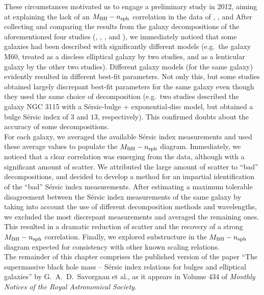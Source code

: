 These circumstances motivated us to engage a preliminary study in 2012, 
aiming at explaining the lack of an $M_{\rm BH} - n_{\rm sph}$ correlation 
in the data of \citeauthor{sani2011}, \citeauthor{vika2012}, and \citeauthor{beifiori2012} 
After collecting and comparing the results from the galaxy decompositions 
of the aforementioned four studies (\citeauthor{grahamdriver2007}, \citeauthor{sani2011}, 
\citeauthor{vika2012}, and \citeauthor{beifiori2012}), 
we immediately noticed that some galaxies had been described with significantly different models 
(e.g.~the galaxy M60, treated as a discless elliptical galaxy by two studies, 
and as a lenticular galaxy by the other two studies). 
Different galaxy models (for the same galaxy) evidently resulted in different best-fit parameters. 
Not only this, but some studies obtained largely discrepant best-fit parameters 
for the same galaxy even though they used the same choice of decomposition 
(e.g.~two studies described the galaxy NGC 3115 with a S\'ersic-bulge + exponential-disc model, 
but obtained a bulge S\'ersic index of $3$ and $13$, respectively). 
This confirmed doubts about the accuracy of some decompositions. \\

For each galaxy, we averaged the available S\'ersic index measurements 
and used these average values to populate the $M_{\rm BH} - n_{\rm sph}$ diagram. 
Immediately, we noticed that a clear correlation was emerging from the data, 
although with a significant amount of scatter. 
We attributed the large amount of scatter to ``bad'' decompositions, 
and decided to develop a method for an impartial identification of the ``bad'' S\'ersic index measurements. 
After estimating a maximum tolerable disagreement between the S\'ersic index measurements of the same galaxy 
by taking into account the use of different decomposition methods and wavelengths, 
we excluded the most discrepant measurements and averaged the remaining ones. 
This resulted in a dramatic reduction of scatter 
and the recovery of a strong $M_{\rm BH} - n_{\rm sph}$ correlation. 
Finally, we explored substructure in the $M_{\rm BH} - n_{\rm sph}$ diagram 
expected for consistency with other known scaling relations. \\

The remainder of this chapter comprises the published version of the paper 
``The supermassive black hole mass -- S\'ersic index relations for bulges and elliptical galaxies''
by G.~A.~D.~Savorgnan et al., 
as it appears in Volume 434 of \emph{Monthly Notices of the Royal Astronomical Society}. 



